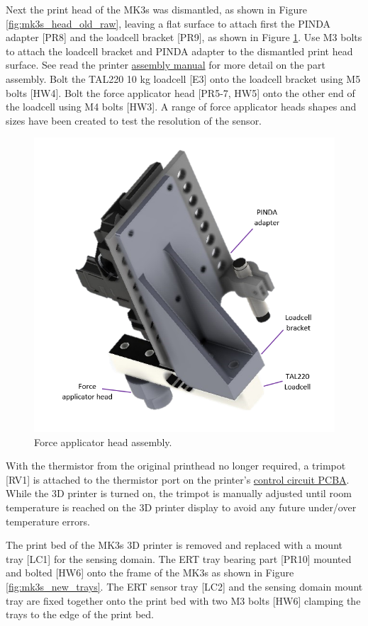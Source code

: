 Next the print head of the MK3s was dismantled, as shown in Figure \ref{fig:mk3s_head_old_raw}, leaving a flat surface to attach first the PINDA adapter [PR8] and the loadcell bracket [PR9], as shown in Figure \ref{fig:mk3s_head_new}. Use M3 bolts to attach the loadcell bracket and PINDA adapter to the dismantled print head surface. See read the printer \href{https://help.prusa3d.com/guide/5-e-axis-assembly_169235#170079}{assembly manual} for more detail on the part assembly\cite{Prusa2023}. Bolt the TAL220 10 kg loadcell [E3] onto the loadcell bracket using M5 bolts [HW4]. Bolt the force applicator head [PR5-7, HW5] onto the other end of the loadcell using M4 bolts [HW3]. A range of force applicator heads shapes and sizes have been created to test the resolution of the sensor. 
\begin{figure}[H]
	\centering
	\includegraphics[width=0.5\linewidth]{Figures/modded_MK3s_print_head_clean_labelled.png}
	\caption{Force applicator head assembly.}
	\label{fig:mk3s_head_new}
\end{figure}
With the thermistor from the original printhead no longer required, a trimpot [RV1] is attached to the thermistor port on the printer's \href{https://help.prusa3d.com/guide/8-electronics-assembly_174100#175539}{control circuit PCBA}\cite{Prusa2023a}. While the 3D printer is turned on, the trimpot is manually adjusted until room temperature is reached on the 3D printer display to avoid any future under/over temperature errors.

The print bed of the MK3s 3D printer is removed and replaced with a mount tray [LC1] for the sensing domain. The ERT tray bearing part [PR10] mounted and bolted [HW6] onto the frame of the MK3s as shown in Figure \ref{fig:mk3s_new_trays}. The ERT sensor tray [LC2] and the sensing domain mount tray are fixed together onto the print bed with two M3 bolts [HW6] clamping the trays to the edge of the print bed.

